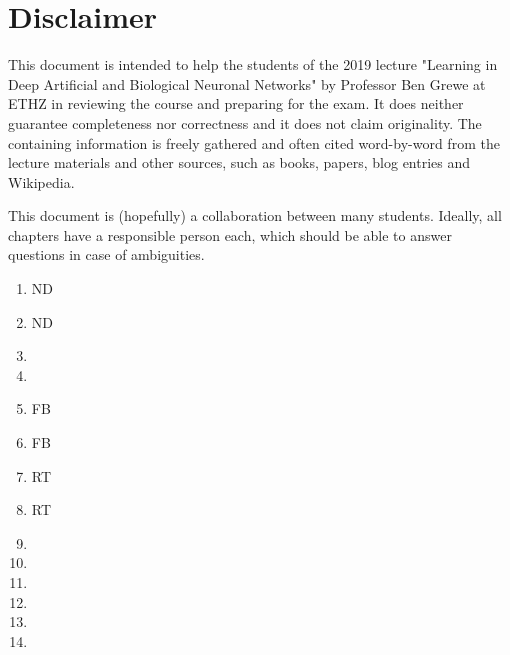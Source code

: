 \documentclass[main]{subfiles}
\begin{document}
\newpage
\section{Disclaimer}
This document is intended to help the students of the 2019 lecture "Learning in Deep Artificial and Biological Neuronal Networks" by Professor Ben Grewe at ETHZ in reviewing the course and preparing for the exam. It does neither guarantee completeness nor correctness and it does not claim originality. The containing information is freely gathered and often cited word-by-word from the lecture materials and other sources, such as books, papers, blog entries and Wikipedia.

This document is (hopefully) a collaboration between many students. Ideally, all chapters have a responsible person each, which should be able to answer questions in case of ambiguities. 
\begin{enumerate}
    \item ND
    \item ND
    \item
    \item
    \item FB
    \item FB
    \item RT
    \item RT
    \item
    \item
    \item
    \item
    \item
    \item
    
\end{enumerate}
\end{document}
